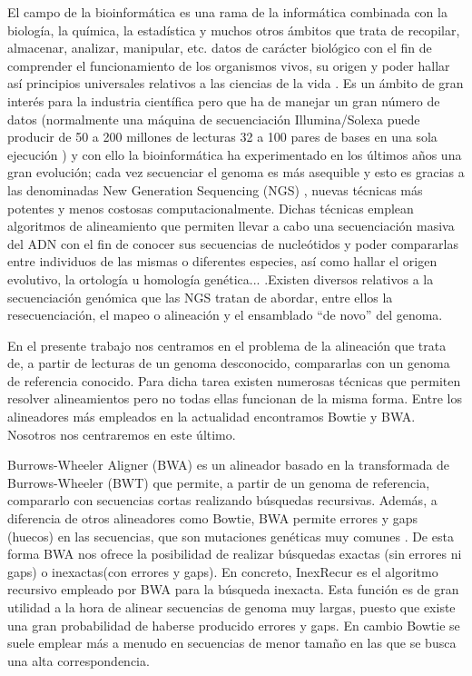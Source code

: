 \documentclass{article}
\begin{document}
El campo de la bioinformática es una rama de la informática  combinada
con la biología, la química, la estadística y muchos otros ámbitos que
trata de recopilar, almacenar, analizar,  manipular,  etc.   datos  de
carácter biológico con el fin de comprender el funcionamiento  de  los
organismos vivos, su origen y poder hallar así principios  universales
relativos a las ciencias de la vida \cite{gimenez_2016}.  Es un ámbito
de gran interés para la industria científica pero que ha de manejar un
gran  número  de  datos  (normalmente  una  máquina  de  secuenciación
Illumina/Solexa puede producir de 50 a 200 millones de lecturas  32  a
100 pares de bases en una sola ejecución \cite{li_durbin_2009}) y  con
ello la bioinformática ha experimentado en los últimos años  una  gran
evolución; cada vez secuenciar el genoma es más asequible  y  esto  es
gracias  a   las   denominadas	 New   Generation   Sequencing	 (NGS)
\cite{gimenez_2016}, nuevas técnicas más  potentes  y  menos  costosas
computacionalmente. Dichas técnicas emplean algoritmos de alineamiento
que  permiten  llevar  a  cabo	una  secuenciación  masiva   del   ADN
\cite{li_durbin_2009}  con  el	fin  de  conocer  sus  secuencias   de
nucleótidos y poder compararlas  entre	individuos  de	las  mismas  o
diferentes especies, así como hallar el origen evolutivo, la ortología
u homología genética... .Existen diversos relativos a la secuenciación
genómica  que  las   NGS   tratan   de	 abordar,   entre   ellos   la
resecuenciación, el mapeo o alineación y el ensamblado “de  novo”  del
genoma\cite{gimenez_2016}.

En el presente trabajo nos centramos en el problema de	la  alineación
que  trata  de,  a  partir  de	lecturas  de  un  genoma  desconocido,
compararlas con un genoma de referencia conocido.   Para  dicha  tarea
existen numerosas técnicas que permiten resolver alineamientos pero no
todas ellas funcionan de la misma forma.  Entre  los  alineadores  más
empleados en la actualidad encontramos Bowtie  y  BWA.	 Nosotros  nos
centraremos en este último.

Burrows-Wheeler  Aligner  (BWA)  es  un   alineador   basado   en   la
transformada de Burrows-Wheeler (BWT) que  permite,  a	partir	de  un
genoma de referencia,  compararlo  con	secuencias  cortas  realizando
búsquedas recursivas.  Además, a diferencia de otros alineadores  como
Bowtie, BWA permite errores y gaps (huecos) en las secuencias, que son
mutaciones genéticas muy comunes \cite{gimenez_2016}.  De  esta  forma
BWA nos ofrece la  posibilidad	de  realizar  búsquedas  exactas  (sin
errores ni gaps) o  inexactas(con  errores  y  gaps)\cite{gomez_2020}.
En concreto, InexRecur es el algoritmo recursivo empleado por BWA para
la búsqueda inexacta.  Esta función es de gran utilidad a la  hora  de
alinear secuencias  de	genoma	muy  largas,  puesto  que  existe  una
gran probabilidad de haberse producido	errores  y  gaps.   En	cambio
Bowtie	se  suele  emplear  más  a  menudo  en	secuencias  de	 menor
tamaño	 en   las   que   se   busca   una    alta    correspondencia.
\end{document}
